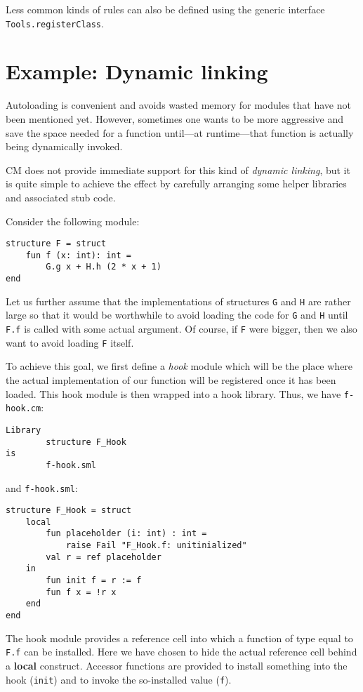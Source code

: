 \documentclass{article}
\begin{document}
Less common kinds of rules can also be defined using the generic
interface {\tt Tools.registerClass}.

\section{Example: Dynamic linking}
\label{sec:dynlink}

Autoloading is convenient and avoids wasted memory for modules that
have not been mentioned yet.  However, sometimes one wants to be more
aggressive and save the space needed for a function until---at
runtime---that function is actually being dynamically invoked.

CM does not provide immediate support for this kind of {\em dynamic
linking}, but it is quite simple to achieve the effect by carefully
arranging some helper libraries and associated stub code.

Consider the following module:
\begin{verbatim}
structure F = struct
    fun f (x: int): int =
        G.g x + H.h (2 * x + 1)
end
\end{verbatim}

Let us further assume that the implementations of structures {\tt G}
and {\tt H} are rather large so that it would be worthwhile to avoid
loading the code for {\tt G} and {\tt H} until {\tt F.f} is called
with some actual argument.  Of course, if {\tt F} were bigger, then we
also want to avoid loading {\tt F} itself.

To achieve this goal, we first define a {\em hook} module which will
be the place where the actual implementation of our function will be
registered once it has been loaded.  This hook module is then wrapped
into a hook library.  Thus, we have {\tt f-hook.cm}:
\begin{verbatim}
Library
        structure F_Hook
is
        f-hook.sml
\end{verbatim}

and {\tt f-hook.sml}:

\begin{verbatim}
structure F_Hook = struct
    local
        fun placeholder (i: int) : int =
            raise Fail "F_Hook.f: unitinialized"
        val r = ref placeholder
    in
        fun init f = r := f
        fun f x = !r x
    end
end
\end{verbatim}

The hook module provides a reference cell into which a function of
type equal to {\tt F.f} can be installed.  Here we have chosen to hide
the actual reference cell behind a {\bf local} construct.  Accessor
functions are provided to install something into the hook
({\tt init}) and to invoke the so-installed value ({\tt f}).
\end{document}
